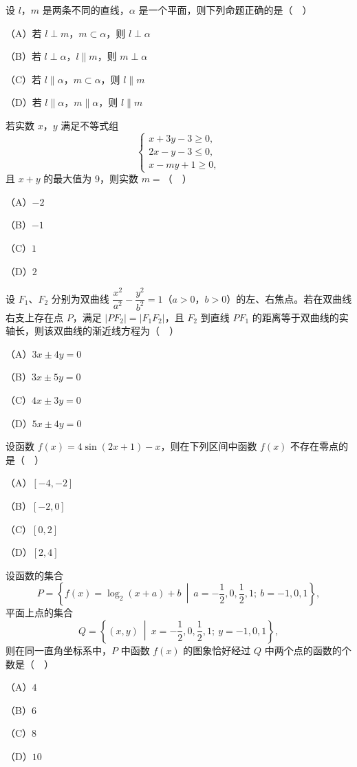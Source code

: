 \begin{question}
设 $l$，$m$ 是两条不同的直线，$\alpha$ 是一个平面，则下列命题正确的是（　）

（A）若 $l\perp m$，$m\subset\alpha$，则 $l\perp\alpha$

（B）若 $l\perp\alpha$，$l\parallel m$，则 $m\perp\alpha$

（C）若 $l\parallel\alpha$，$m\subset\alpha$，则 $l\parallel m$

（D）若 $l\parallel\alpha$，$m\parallel\alpha$，则 $l\parallel m$

\end{question}
\begin{question}
若实数 $x$，$y$ 满足不等式组
\nopagebreak[4]
\[\begin{cases}
x+3y-3\geqslant 0,\\
2x-y-3\leqslant 0,\\
x-my+1\geqslant 0,
\end{cases}\]
且 $x+y$ 的最大值为 $9$，则实数 $m=$（　）

（A）$-2$

（B）$-1$

（C）$1$

（D）$2$

\end{question}
\begin{question}
设 $F_1$、$F_2$ 分别为双曲线 $\dfrac{x^2}{a^2}-\dfrac{y^2}{b^2}=1$（$a>0$，$b>0$）的左、右焦点。若在双曲线右支上存在点 $P$，满足 $|PF_2|=|F_1F_2|$，且 $F_2$ 到直线 $PF_1$ 的距离等于双曲线的实轴长，则该双曲线的渐近线方程为（　）

（A）$3x\pm 4y=0$

（B）$3x\pm 5y=0$

（C）$4x\pm 3y=0$

（D）$5x\pm 4y=0$

\end{question}
\begin{question}
设函数 $f(x)=4\sin(2x+1)-x$，则在下列区间中函数 $f(x)$ 不存在零点的是（　）

（A）$[-4,-2]$

（B）$[-2,0]$

（C）$[0,2]$

（D）$[2,4]$

\end{question}
\begin{question}
设函数的集合
\nopagebreak[4]
\[P=\left\{f(x)=\log_2(x+a)+b\ \middle|\ a=-\frac12,0,\frac12,1;\ b=-1,0,1\right\},\]
平面上点的集合
\nopagebreak[4]
\[Q=\left\{(x,y)\ \middle|\ x=-\frac12,0,\frac12,1;\ y=-1,0,1\right\},\]
则在同一直角坐标系中，$P$ 中函数 $f(x)$ 的图象恰好经过 $Q$ 中两个点的函数的个数是（　）

（A）$4$

（B）$6$

（C）$8$

（D）$10$

\end{question}
